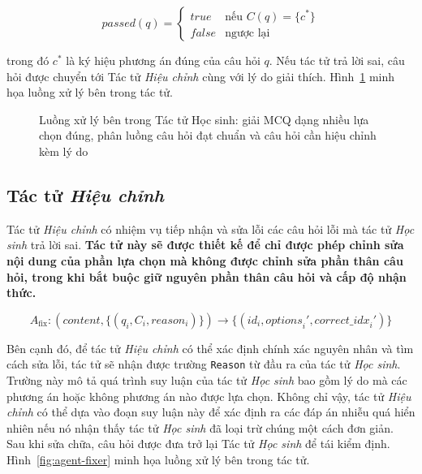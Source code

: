 \begin{equation}
\textit{passed}(q) = \begin{cases}
\textit{true} & \text{nếu } C(q) = \{c^*\} \\
\textit{false} & \text{ngược lại}
\end{cases}
\end{equation}

\noindent trong đó $c^*$ là ký hiệu phương án đúng của câu hỏi $q$. Nếu tác tử trả lời sai, câu hỏi được chuyển tới Tác tử \textit{Hiệu chỉnh} cùng với lý do giải thích. Hình~\ref{fig:agent-student} minh họa luồng xử lý bên trong tác tử.

\begin{figure}[htbp]
    \centering
    \resizebox{0.85\textwidth}{!}{}
    \caption{Luồng xử lý bên trong Tác tử Học sinh: giải MCQ dạng nhiều lựa chọn đúng, phân luồng câu hỏi đạt chuẩn và câu hỏi cần hiệu chỉnh kèm lý do}
    \label{fig:agent-student}
\end{figure}

\subsection{Tác tử \textit{Hiệu chỉnh}}
Tác tử \textit{Hiệu chỉnh} có nhiệm vụ tiếp nhận và sửa lỗi các câu hỏi lỗi mà tác tử \textit{Học sinh} trả lời sai. \textbf{Tác tử này sẽ được thiết kế để chỉ được phép chỉnh sửa nội dung của phần lựa chọn mà không được chỉnh sửa phần thân câu hỏi, trong khi bắt buộc giữ nguyên phần thân câu hỏi và cấp độ nhận thức.}

\begin{equation}
A_{\text{fix}}: (\textit{content}, \{(q_i, C_i, \textit{reason}_i)\}) \longrightarrow \{(\textit{id}_i, \textit{options}_i', \textit{correct\_idx}_i')\}
\end{equation}

Bên cạnh đó, để tác tử \textit{Hiệu chỉnh} có thể xác định chính xác nguyên nhân và tìm cách sửa lỗi, tác tử sẽ nhận được trường \texttt{Reason} từ đầu ra của tác tử \textit{Học sinh}. Trường này mô tả quá trình suy luận của tác tử \textit{Học sinh} bao gồm lý do mà các phương án hoặc không phương án nào được lựa chọn. Không chỉ vậy, tác tử \textit{Hiệu chỉnh} có thể dựa vào đoạn suy luận này để xác định ra các đáp án nhiễu quá hiển nhiên nếu nó nhận thấy tác tử \textit{Học sinh} đã loại trừ chúng một cách đơn giản. Sau khi sửa chữa, câu hỏi được đưa trở lại Tác tử \textit{Học sinh} để tái kiểm định. Hình~\ref{fig:agent-fixer} minh họa luồng xử lý bên trong tác tử.

